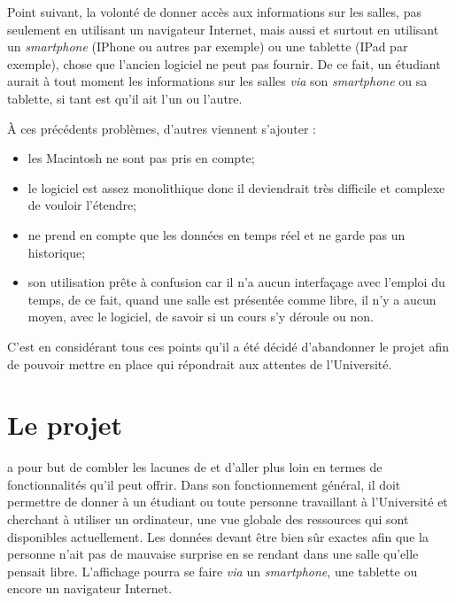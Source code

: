 Point suivant, la volont\'e de donner acc\`es aux informations sur les salles, pas seulement en utilisant un navigateur Internet, mais aussi et surtout en utilisant un \textit{smartphone} (IPhone ou autres par exemple) ou une tablette (IPad par exemple), chose que l'ancien logiciel ne peut pas fournir.
De ce fait, un \'etudiant aurait \`a tout moment les informations sur les salles \textit{via} son \textit{smartphone} ou sa tablette, si tant est qu'il ait l'un ou l'autre.

\noindent \`A ces pr\'ec\'edents probl\`emes, d'autres viennent s'ajouter :

\begin{itemize}
	\item les Macintosh ne sont pas pris en compte;
	\item le logiciel est assez monolithique donc il deviendrait tr\`es difficile et complexe de vouloir l'\'etendre;
	\item {\Yuukou} ne prend en compte que les donn\'ees en temps r\'eel et ne garde pas un historique;
	\item son utilisation pr\^ete \`a confusion car il n'a aucun interfa\c{c}age avec l'emploi du temps, de ce fait, quand une salle est pr\'esent\'ee comme libre, il n'y a aucun moyen, avec le logiciel, de savoir si un cours s'y d\'eroule ou non.

\end{itemize}

\vspace{0.20cm}

C'est en consid\'erant tous ces points qu'il a \'et\'e d\'ecid\'e d'abandonner le projet \Yuukou{} afin de pouvoir mettre en place \YuukouII{} qui r\'epondrait aux attentes de l'Universit\'e.

\section{Le projet \YuukouII}


\YuukouII{} a pour but de combler les lacunes de \Yuukou{} et d'aller plus loin en termes de fonctionnalit\'es qu'il peut offrir. 
Dans son fonctionnement g\'en\'eral, il doit permettre de donner \`a un \'etudiant ou toute personne travaillant \`a l'Universit\'e et cherchant \`a utiliser un ordinateur, une vue globale des ressources qui sont disponibles actuellement.
Les donn\'ees devant \^etre bien s\^ur exactes afin que la personne n'ait pas de mauvaise surprise en se rendant dans une salle qu'elle pensait libre.
L'affichage pourra se faire \textit{via} un \textit{smartphone}, une tablette ou encore un navigateur Internet.

